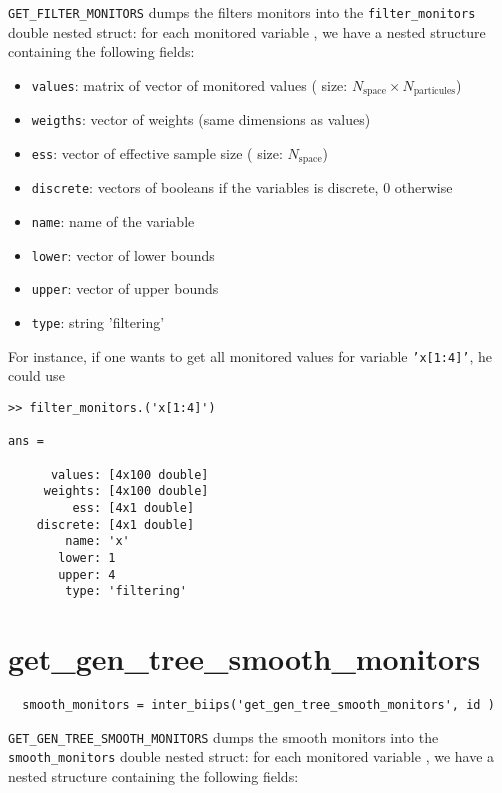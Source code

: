 \documentclass[11pt,twoside]{article}
\begin{document}
 \texttt{GET\_FILTER\_MONITORS} dumps the filters monitors into the \texttt{filter\_monitors} double nested struct: for each monitored variable , we have
  a nested structure containing the following fields:
  \begin{itemize}
   \item \texttt{values}: matrix of vector of monitored values ( size: $N_{\mbox{space}} \times N_{\mbox{particules}}$)
   \item \texttt{weigths}: vector of weights (same dimensions as values)
   \item \texttt{ess}: vector of effective  sample size ( size: $N_{\mbox{space}}$)
   \item \texttt{discrete}: vectors of booleans if the variables is discrete, 0 otherwise
   \item \texttt{name}: name of the variable
   \item \texttt{lower}: vector of lower bounds
   \item \texttt{upper}: vector of upper bounds
   \item \texttt{type}: string  'filtering'
   \end{itemize}

  For instance, if one wants to get all monitored values for variable \texttt{'x[1:4]'}, he could use
 \begin{lstlisting}
>> filter_monitors.('x[1:4]')

ans =

      values: [4x100 double]
     weights: [4x100 double]
         ess: [4x1 double]
    discrete: [4x1 double]
        name: 'x'
       lower: 1
       upper: 4
        type: 'filtering'

 \end{lstlisting}

 \section{get\_gen\_tree\_smooth\_monitors}

 \begin{lstlisting}
  smooth_monitors = inter_biips('get_gen_tree_smooth_monitors', id )
 \end{lstlisting}

 \texttt{GET\_GEN\_TREE\_SMOOTH\_MONITORS} dumps the smooth monitors into the \texttt{smooth\_monitors} double nested struct: for each monitored variable , we have
  a nested structure containing the following fields:
\end{document}
